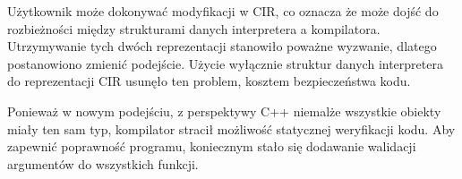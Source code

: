 Użytkownik może dokonywać modyfikacji w CIR, co oznacza że może dojść do rozbieżności między strukturami danych interpretera a kompilatora. Utrzymywanie tych dwóch reprezentacji stanowiło poważne wyzwanie, dlatego postanowiono zmienić podejście. Użycie wyłącznie struktur danych interpretera do reprezentacji CIR usunęło ten problem, kosztem bezpieczeństwa kodu.


Ponieważ w nowym podejściu, z perspektywy C++ niemalże wszystkie obiekty miały ten sam typ, kompilator stracił możliwość statycznej weryfikacji kodu.
Aby zapewnić poprawność programu, koniecznym stało się dodawanie walidacji argumentów do wszystkich funkcji.
